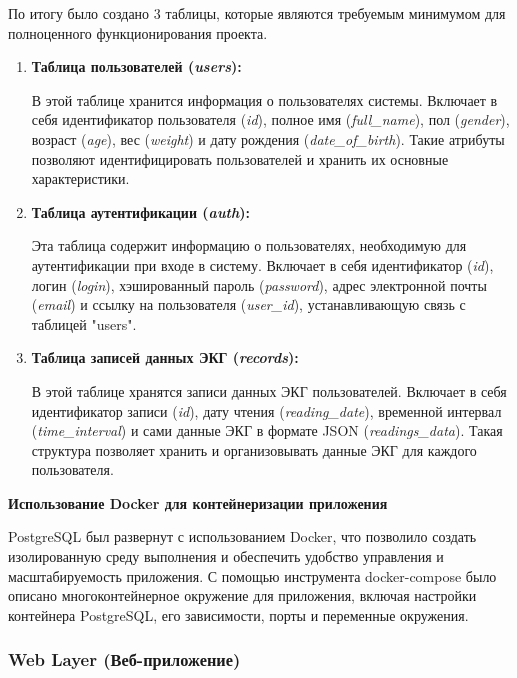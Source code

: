 \documentclass[12pt, russian]{extarticle}
\begin{document}
\begin{spacing}{1.5}
По итогу было создано 3 таблицы, которые являются требуемым минимумом для полноценного функционирования проекта.

\begin{enumerate}
    \item \textbf{Таблица пользователей (\textit{users}):}

    В этой таблице хранится информация о пользователях системы. Включает в себя идентификатор пользователя (\textit{id}), полное имя (\textit{full\_name}), пол (\textit{gender}), возраст (\textit{age}), вес (\textit{weight}) и дату рождения (\textit{date\_of\_birth}). Такие атрибуты позволяют идентифицировать пользователей и хранить их основные характеристики.
    
    \item \textbf{Таблица аутентификации (\textit{auth}):}
    
    Эта таблица содержит информацию о пользователях, необходимую для аутентификации при входе в систему. Включает в себя идентификатор (\textit{id}), логин (\textit{login}), хэшированный пароль (\textit{password}), адрес электронной почты (\textit{email}) и ссылку на пользователя (\textit{user\_id}), устанавливающую связь с таблицей "users".
    
    \item \textbf{Таблица записей данных ЭКГ (\textit{records}):}
    
    В этой таблице хранятся записи данных ЭКГ пользователей. Включает в себя идентификатор записи (\textit{id}), дату чтения (\textit{reading\_date}), временной интервал (\textit{time\_interval}) и сами данные ЭКГ в формате JSON (\textit{readings\_data}). Такая структура позволяет хранить и организовывать данные ЭКГ для каждого пользователя.
    
\end{enumerate}

\par \noindent \textbf{Использование Docker для контейнеризации приложения}

PostgreSQL был развернут с использованием Docker, что позволило создать изолированную среду выполнения и обеспечить удобство управления и масштабируемость приложения. С помощью инструмента docker-compose было описано многоконтейнерное окружение для приложения, включая настройки контейнера PostgreSQL, его зависимости, порты и переменные окружения.

\subsubsection{Web Layer (Веб-приложение)}


\end{spacing}
\end{document}
